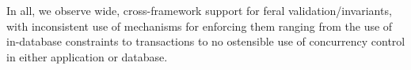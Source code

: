  In all, we observe wide, cross-framework support
for feral validation/invariants, with inconsistent use of mechanisms
for enforcing them ranging from the use of in-database constraints to
transactions to no ostensible use of concurrency control in either
application or database.


\begin{comment}

Name & PK & FK & UDF Validations
DJANGO & Automatic & Automatic & Yes
JPA & Yes, annotation & Yes, annotation & Yes, via Beans
CakePHP & 


Supports validations
https://docs.djangoproject.com/en/dev/ref/validators/

Broken online: http://stackoverflow.com/a/5690705


1.9 (not yet released) deprecating in favor of checks
https://docs.djangoproject.com/en/1.7/internals/deprecation/

checks:
https://docs.djangoproject.com/en/1.7/topics/checks/




does it right
https://docs.djangoproject.com/en/1.7/ref/models/fields/#django.db.models.ForeignKey


does it right, by default declares an index
https://docs.djangoproject.com/en/1.7/_modules/django/db/backends/schema/


'''
If True, this field must be unique throughout the table.

This is enforced at the database level and by model validation. If you try to save a model with a duplicate value in a unique field, a django.db.IntegrityError will be raised by the model’s save() method.

This option is valid on all field types except ManyToManyField, OneToOneField, and FileField.

Note that when unique is True, you don’t need to specify db_index, because unique implies the creation of an index.
'''
a




no FK by default, relies on JPA
http://docs.jboss.org/hibernate/orm/4.3/manual/en-US/html/ch08.html

JoinColumn
http://docs.oracle.com/javaee/6/api/javax/persistence/OneToMany.html


\end{comment}
